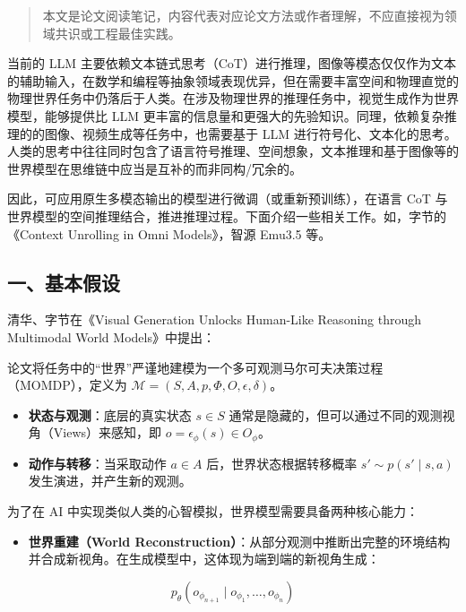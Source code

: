 \begin{quote}
本文是论文阅读笔记，内容代表对应论文方法或作者理解，不应直接视为领域共识或工程最佳实践。
\end{quote}

当前的 LLM 主要依赖文本链式思考（CoT）进行推理，图像等模态仅仅作为文本的辅助输入，在数学和编程等抽象领域表现优异，但在需要丰富空间和物理直觉的物理世界任务中仍落后于人类。在涉及物理世界的推理任务中，视觉生成作为世界模型，能够提供比 LLM 更丰富的信息量和更强大的先验知识。同理，依赖复杂推理的的图像、视频生成等任务中，也需要基于 LLM 进行符号化、文本化的思考。人类的思考中往往同时包含了语言符号推理、空间想象，文本推理和基于图像等的世界模型在思维链中应当是互补的而非同构/冗余的。

因此，可应用原生多模态输出的模型进行微调（或重新预训练），在语言 CoT 与世界模型的空间推理结合，推进推理过程。下面介绍一些相关工作。如，字节的《Context Unrolling in Omni Models》，智源 Emu3.5 等。

\hypertarget{ux4e00ux57faux672cux5047ux8bbe}{%
\subsection{一、基本假设}\label{ux4e00ux57faux672cux5047ux8bbe}}

清华、字节在《Visual Generation Unlocks Human-Like Reasoning through Multimodal World Models》中提出：

论文将任务中的``世界''严谨地建模为一个多可观测马尔可夫决策过程（MOMDP），定义为 \(\mathcal{M}=(S,A,p,\Phi,O,\epsilon,\delta)\)。

\begin{itemize}
\tightlist
\item
  \textbf{状态与观测}：底层的真实状态 \(s\in S\) 通常是隐藏的，但可以通过不同的观测视角（Views）来感知，即 \(o=\epsilon_{\phi}(s)\in O_{\phi}\)。
\item
  \textbf{动作与转移}：当采取动作 \(a\in A\) 后，世界状态根据转移概率 \(s'\sim p(s'\mid s,a)\) 发生演进，并产生新的观测。
\end{itemize}

为了在 AI 中实现类似人类的心智模拟，世界模型需要具备两种核心能力：

\begin{itemize}
\tightlist
\item
  \textbf{世界重建（World Reconstruction）}：从部分观测中推断出完整的环境结构并合成新视角。在生成模型中，这体现为端到端的新视角生成：
\end{itemize}

\[
p_{\theta}(o_{\phi_{n+1}}\mid o_{\phi_1},\ldots,o_{\phi_n})
\]

